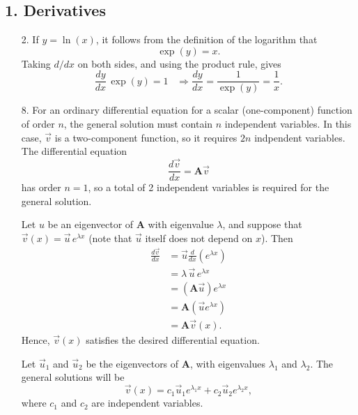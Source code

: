 \documentclass[10pt,a4paper]{article}
\begin{document}
\subsection*{1. Derivatives}

\begin{enumerate}
\item[2.]
If $y = \ln(x)$, it follows from the definition of the logarithm that
\begin{equation}
  \exp(y) = x.
\end{equation}
Taking $d/dx$ on both sides, and using the product rule, gives
\begin{equation}
  \frac{dy}{dx} \, \exp(y) = 1 \;\;\; \Rightarrow \frac{dy}{dx} = \frac{1}{\exp(y)} = \frac{1}{x}.
\end{equation}

\item[8.]
For an ordinary differential equation for a scalar (one-component)
function of order $n$, the general solution must contain $n$
independent variables. In this case, $\vec{v}$ is a two-component
function, so it requires $2n$ indpendent variables. The differential
equation
\begin{equation}
  \frac{d\vec{v}}{dx} = \mathbf{A} \vec{v}
\end{equation}
has order $n = 1$, so a total of 2 independent variables is required
for the general solution.

Let $u$ be an eigenvector of $\mathbf{A}$ with eigenvalue $\lambda$,
and suppose that $\vec{v}(x) = \vec{u}\,e^{\lambda x}$ (note that
$\vec{u}$ itself does not depend on $x$). Then
\begin{align}
  \frac{d\vec{v}}{dx} &= \vec{u} \frac{d}{dx}\left(e^{\lambda x}\right) \\
  &= \lambda \, \vec{u}\, e^{\lambda x} \\
  &= \left(\mathbf{A} \vec{u}\right) e^{\lambda x} \\
  &= \mathbf{A} \left(\vec{u} e^{\lambda x}\right) \\
  &= \mathbf{A} \vec{v}(x).
\end{align}
Hence, $\vec{v}(x)$ satisfies the desired differential equation.

Let $\vec{u}_1$ and $\vec{u}_2$ be the eigenvectors of $\mathbf{A}$,
with eigenvalues $\lambda_1$ and $\lambda_2$. The general solutions
will be
\begin{equation}
  \vec{v}(x) = c_1 \vec{u}_1 e^{\lambda_1 x} + c_2 \vec{u}_2 e^{\lambda_2 x},
\end{equation}
where $c_1$ and $c_2$ are independent variables.
\end{enumerate}
\end{document}
